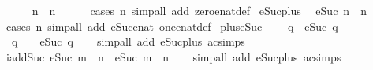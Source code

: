 \begin{isabellebody}
\ \ \isamarkupfalse%
\ {\isachardoublequoteopen}{}\ {\isacharplus}\ n\ {\isacharequal}\ n{\isachardoublequoteclose}\isanewline
\ \ \ \ \isamarkupfalse%
\ {\isacharparenleft}cases\ n{\isacharparenright}\ {\isacharparenleft}simp{\isacharunderscore}all\ add{\isacharcolon}\ zero{\isacharunderscore}enat{\isacharunderscore}def{\isacharparenright}\isanewline
{}\isamarkupfalse%
%
\endisatagproof
{\isafoldproof}%
%
\isadelimproof
\isanewline
%
\endisadelimproof
\isanewline
{}\isamarkupfalse%
\isanewline
\isanewline
{}\isamarkupfalse%
\ eSuc{\isacharunderscore}plus{\isacharunderscore}{}{\isacharcolon}\isanewline
\ \ {\isachardoublequoteopen}eSuc\ n\ {\isacharequal}\ n\ {\isacharplus}\ {}{\isachardoublequoteclose}\isanewline
%
\isadelimproof
\ \ %
\endisadelimproof
%
\isatagproof
{}\isamarkupfalse%
\ {\isacharparenleft}cases\ n{\isacharparenright}\ {\isacharparenleft}simp{\isacharunderscore}all\ add{\isacharcolon}\ eSuc{\isacharunderscore}enat\ one{\isacharunderscore}enat{\isacharunderscore}def{\isacharparenright}%
\endisatagproof
{\isafoldproof}%
%
\isadelimproof
\isanewline
%
\endisadelimproof
\isanewline
{}\isamarkupfalse%
\ plus{\isacharunderscore}{}{\isacharunderscore}eSuc{\isacharcolon}\isanewline
\ \ {\isachardoublequoteopen}{}\ {\isacharplus}\ q\ {\isacharequal}\ eSuc\ q{\isachardoublequoteclose}\isanewline
\ \ {\isachardoublequoteopen}q\ {\isacharplus}\ {}\ {\isacharequal}\ eSuc\ q{\isachardoublequoteclose}\isanewline
%
\isadelimproof
\ \ %
\endisadelimproof
%
\isatagproof
{}\isamarkupfalse%
\ {\isacharparenleft}simp{\isacharunderscore}all\ add{\isacharcolon}\ eSuc{\isacharunderscore}plus{\isacharunderscore}{}\ ac{\isacharunderscore}simps{\isacharparenright}%
\endisatagproof
{\isafoldproof}%
%
\isadelimproof
\isanewline
%
\endisadelimproof
\isanewline
{}\isamarkupfalse%
\ iadd{\isacharunderscore}Suc{\isacharcolon}\ {\isachardoublequoteopen}eSuc\ m\ {\isacharplus}\ n\ {\isacharequal}\ eSuc\ {\isacharparenleft}m\ {\isacharplus}\ n{\isacharparenright}{\isachardoublequoteclose}\isanewline
%
\isadelimproof
\ \ %
\endisadelimproof
%
\isatagproof
{}\isamarkupfalse%
\ {\isacharparenleft}simp{\isacharunderscore}all\ add{\isacharcolon}\ eSuc{\isacharunderscore}plus{\isacharunderscore}{}\ ac{\isacharunderscore}simps{\isacharparenright}%
\endisatagproof
{\isafoldproof}%
%
\isadelimproof
\isanewline
%
\endisadelimproof
\isanewline

\end{isabellebody}
